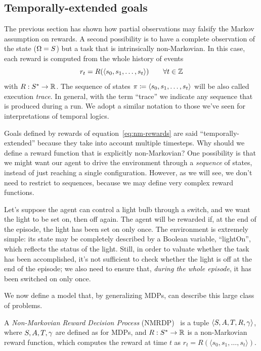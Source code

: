 \subsection{Temporally-extended goals}

\label{sec:tempoal-goals}

The previous section has shown how partial observations may falsify the Markov
assumption on rewards. A second possibility is to have a complete observation
of the state ($\Omega = S$) but a task that is intrinsically
non-Markovian. In this case, each reward is computed from the whole history
of events
\begin{equation}
	r_t = R(\langle s_0, s_1, \dots, s_t \rangle) \qquad \forall t \in \mathbb{Z}
	\label{eq:nm-rewards}
\end{equation}
with $R: S^* \to \mathbb{R}$. The sequence of states $\pi
\coloneqq \langle s_0, s_1, \dots, s_t \rangle$ will be also called
execution \emph{trace}. In general, with the term ``trace'' we indicate any
sequence that is produced during a run. We adopt a similar notation to those
we've seen for interpretations of temporal logics.

Goals defined by rewards of equation~\eqref{eq:nm-rewards} are said
``temporally-extended'' because they take into account multiple timesteps. Why
should we define a reward function that is explicitly non-Markovian? One
possibility is that we might want our agent to drive the environment through a
\emph{sequence} of states, instead of just reaching a single configuration.
However, as we will see, we don't need to restrict to sequences, because we
may define very complex reward functions.

\begin{example}
	Let's suppose the agent can control a light bulb through a switch, and we
	want the light to be set on, then off again. The agent will be rewarded if,
	at the end of the episode, the light has been set on only once.  The
	environment is extremely simple: its state may be completely described by a
	Boolean variable, ``lightOn'', which reflects the status of the light.
	Still, in order to valuate whether the task has been accomplished, it's not
	sufficient to check whether the light is off at the end of the episode; we
	also need to ensure that, \emph{during the whole episode}, it has been
	switched on only once.
	\label{ex:light}
\end{example}

We now define a model that, by generalizing MDPs, can describe this large
class of problems.
\begin{definition}
	A \emph{Non-Markovian Reward Decision Process}
	(NMRDP)~\cite{bib:nmrdp-logic-first} is a tuple $\langle S, A, T, R,
	\gamma \rangle$, where $S, A, T, \gamma$ are defined as for
	MDPs, and $R: S^* \to \mathbb{R}$ is a non-Markovian reward function, which
	computes the reward at time $t$ as $r_t = R(\langle s_0, s_1, \dots, s_t
	\rangle)$.
\end{definition}


